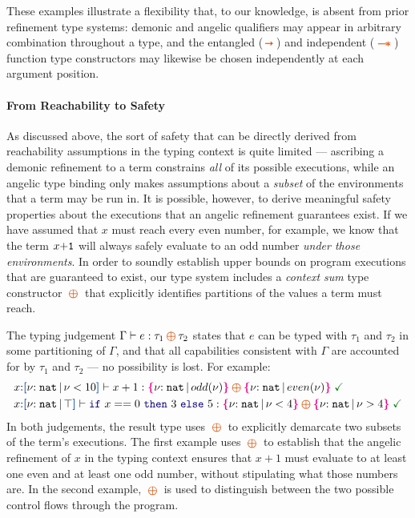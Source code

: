 These examples illustrate a flexibility that, to our knowledge, is
absent from prior refinement type systems: demonic and angelic
qualifiers may appear in arbitrary combination throughout a type, and
the entangled ($\ctsarr$) and independent ($\ctwand$) function type
constructors may likewise be chosen independently at each argument
position.

\paragraph{From Reachability to Safety}
As discussed above, the sort of safety that can be directly derived
from reachability assumptions in the typing context is quite limited
--- ascribing a demonic refinement to a term constrains \emph{all} of
its possible executions, while an angelic type binding only makes
assumptions about a \emph{subset} of the environments that a term may
be run in. It is possible, however, to derive meaningful safety
properties about the executions that an angelic refinement guarantees
exist. If we have assumed that $x$ must reach every even number, for
example, we know that the term $x {\tt + 1}$ will always safely
evaluate to an odd number \emph{under those environments}. In order to
soundly establish upper bounds on program executions that are
guaranteed to exist, our type system includes a \emph{context sum}
type constructor $\ctoplus$ that explicitly identifies partitions of
the values a term must reach.

The typing judgement $\Gamma \vdash e : \tau_1 \ctoplus \tau_2$ states
that $e$ can be typed with $\tau_1$ and $\tau_2$ in some partitioning
of $\Gamma$, and that all capabilities consistent with $\Gamma$ are
accounted for by $\tau_1$ and $\tau_2$ --- no possibility is lost.
For example: \vspace{-0.2em}
\begin{align*}
  &x{:}\urt{\Nat}{\vnu < 10} \vdash x + 1 : \ort{\Nat}{odd(\vnu)} \ctoplus
    \ort{\Nat}{even(\vnu)} \;\judgok \notag \\
  &x{:}\urt{\Nat}{\top} \vdash \zif{x == 0}{3}{5} : \ort{\Nat}{\vnu <
    4}\ctoplus \ort{\Nat}{\vnu > 4} \;\judgok
\end{align*}\noindent
In both judgements, the result type uses $\ctoplus$ to explicitly
demarcate two subsets of the term's executions. The first example uses
$\ctoplus$ to establish that the angelic refinement of $x$ in the
typing context ensures that $x + 1$ must evaluate to at least one even
and at least one odd number, without stipulating what those numbers
are. In the second example, $\ctoplus$ is used to distinguish between
the two possible control flows through the program.

